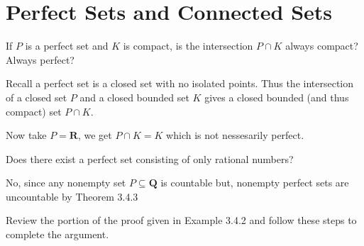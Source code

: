 \section{Perfect Sets and Connected Sets}

\begin{exercise}
  If $P$ is a perfect set and $K$ is compact, is the intersection $P \cap K$ always compact? Always perfect?
\end{exercise}

\begin{solution}
  Recall a perfect set is a closed set with no isolated points. Thus the intersection of a closed set $P$ and a closed bounded set $K$ gives a closed bounded (and thus compact) set $P \cap K$.

  Now take $P = \mathbf{R}$, we get $P \cap K = K$ which is not nessesarily perfect.
\end{solution}

\begin{exercise}
  Does there exist a perfect set consisting of only rational numbers?
\end{exercise}

\begin{solution}
  No, since any nonempty set $P \subseteq \mathbf Q$ is countable but, nonempty perfect sets are uncountable by Theorem 3.4.3
\end{solution}

\begin{exercise}
  Review the portion of the proof given in Example 3.4.2 and follow these steps to complete the argument.
\end{exercise}

\begin{solution}
\end{solution}

